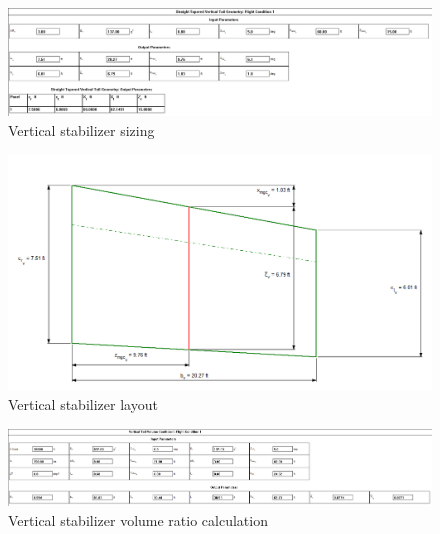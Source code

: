 \documentclass[conf]{new-aiaa}
\begin{document}
\begin{figure}[H]
    \includegraphics[width=\textwidth]{Report3Printouts/Empannage/Vertical_geometry_cropped.png}
    \caption{Vertical stabilizer sizing}
    \label{fig:vertical_geometry}
\end{figure}

\begin{figure}[H]
    \includegraphics[width=\textwidth]{Report3Printouts/Empannage/Vertical_geometry_plot.png}
    \caption{Vertical stabilizer layout}
    \label{fig:vertical_geometry_plot}
\end{figure}

\begin{figure}[H]
    \includegraphics[width=\textwidth]{Report3Printouts/Empannage/Vertical_volumeratio_cropped.png}
    \caption{Vertical stabilizer volume ratio calculation}
    \label{fig:vertical_volumeratio}
\end{figure}
\end{document}
